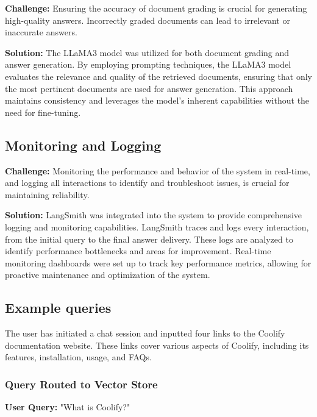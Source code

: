 \textbf{Challenge:} Ensuring the accuracy of document grading is crucial for generating high-quality answers. Incorrectly graded documents can lead to irrelevant or inaccurate answers.

\textbf{Solution:} The LLaMA3 model was utilized for both document grading and answer generation. By employing prompting techniques, the LLaMA3 model evaluates the relevance and quality of the retrieved documents, ensuring that only the most pertinent documents are used for answer generation. This approach maintains consistency and leverages the model's inherent capabilities without the need for fine-tuning.

\subsection{Monitoring and Logging}

\textbf{Challenge:} Monitoring the performance and behavior of the system in real-time, and logging all interactions to identify and troubleshoot issues, is crucial for maintaining reliability.

\textbf{Solution:} LangSmith was integrated into the system to provide comprehensive logging and monitoring capabilities. LangSmith traces and logs every interaction, from the initial query to the final answer delivery. These logs are analyzed to identify performance bottlenecks and areas for improvement. Real-time monitoring dashboards were set up to track key performance metrics, allowing for proactive maintenance and optimization of the system.

\subsection*{Example queries}

The user has initiated a chat session and inputted four links to the Coolify documentation website. These links cover various aspects of Coolify, including its features, installation, usage, and FAQs.

\subsubsection*{Query Routed to Vector Store}

\textbf{User Query:} "What is Coolify?"

